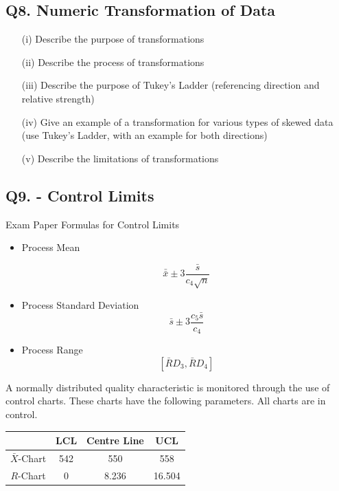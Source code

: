 \documentclass[a4paper,12pt]{article}
\begin{document}
\subsection*{Q8. Numeric Transformation of Data} %


\begin{itemize}
	\item[(i)] Describe the purpose of transformations
	\item[(ii)] Describe the process of transformations
	\item[(iii)] Describe the purpose of Tukey's Ladder (referencing direction and relative strength)
	\item[(iv)] Give an example of a transformation for various types of skewed data (use Tukey's Ladder, with an example for both directions)
	\item[(v)] Describe the limitations of transformations
\end{itemize}
\newpage
\subsection*{Q9. - Control Limits }

\begin{framed}
	Exam Paper Formulas for Control Limits
	\begin{itemize}
		\item Process Mean
		
		
		
		\[ \bar{\bar{x}} \pm 3\frac{\bar{s}}{c_4\sqrt{n}}\]
		\item Process Standard Deviation	
		\[ \bar{s} \pm 3\frac{c_5\bar{s}}{c_4}\]
		\item Process Range	
		\[\left[ \bar{R}D_3, \bar{R}D_4\right]\]
	\end{itemize}	
\end{framed}



A normally distributed quality characteristic is monitored through the use of control charts. These charts have the following parameters. All charts are in control.
\begin{center}
	\begin{tabular}{|c|c|c|c|}
		\hline  & LCL & Centre Line & UCL \\
		\hline $\bar{X}$-Chart & 542 & 550 & 558 \\
		\hline $R$-Chart & 0 & 8.236 & 16.504 \\ \hline
	\end{tabular}
\end{center}
\end{document}
